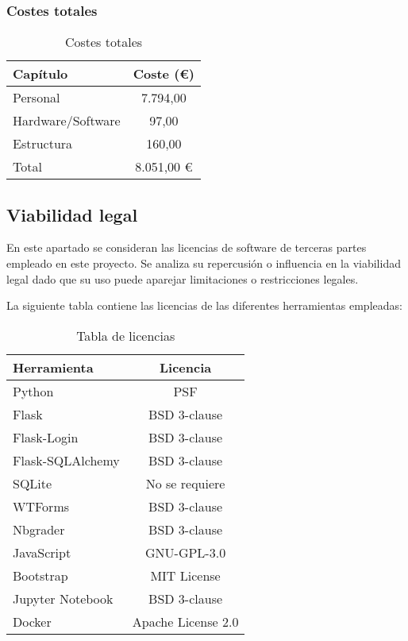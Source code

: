 \subsubsection{Costes totales}

\begin{table}[H]
\begin{center}
\begin{tabular}{| l | c |} \hline
\textbf{Capítulo}   & \textbf{Coste (€)}  \\ \hline
Personal & 7.794,00\\
Hardware/Software & 97,00\\
Estructura &  160,00 \\ \hline
Total  & 8.051,00 €\\ \hline
\end{tabular}
\caption{Costes totales}
\end{center}
\end{table}



\subsection{Viabilidad legal}
En este apartado se consideran las licencias de software de terceras partes empleado en este proyecto.  Se analiza su repercusión o influencia en la viabilidad legal dado que su uso puede aparejar limitaciones o restricciones legales.

La siguiente tabla contiene las licencias de las diferentes herramientas empleadas:

\begin{table}[H]
\begin{center}
\begin{tabular}{| l | c |} \hline
\textbf{Herramienta}   & \textbf{Licencia}  \\ \hline
Python	&		PSF \\
Flask	&		BSD 3-clause \\
Flask-Login	&	BSD 3-clause\\ 
Flask-SQLAlchemy &	BSD 3-clause\\
SQLite	&		No se requiere\\
WTForms	&	BSD 3-clause\\
Nbgrader	&	BSD 3-clause\\
JavaScript	&	GNU-GPL-3.0\\
Bootstrap &		MIT License\\
Jupyter Notebook &	BSD 3-clause\\
Docker	&		Apache License 2.0\\\hline
\end{tabular}
\caption{Tabla de licencias}
\end{center}
\end{table}


